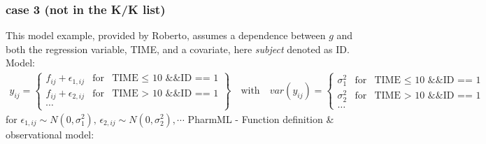 \documentclass[a4paper,10pt]{article}
\begin{document}
\subsubsection{case 3 (not in the K/K list)}
This model example, provided by Roberto, assumes a dependence between $g$ and both the regression variable, TIME, and a covariate, here \textit{subject} denoted as ID.
Model: 
\begin{eqnarray}
y_{ij} = \left\{ \begin{array}{rcl}  f_{ij} + \epsilon_{1,ij}  & \mbox{for} & \text{TIME $\le$ 10 \&\& ID == 1} \\
f_{ij} + \epsilon_{2,ij}  & \mbox{for} & \text{TIME $>$ 10 \&\& ID == 1} \nonumber \\
\cdots \nonumber
\end{array}\right\} \quad \text{with} \quad
\mathit{var}(y_{ij}) = \left\{ \begin{array}{rcl}  \sigma_{1}^2  & \mbox{for} & \text{TIME $\le$ 10 \&\& ID == 1} \\
\sigma_{2}^2  & \mbox{for} & \text{TIME $>$ 10 \&\& ID == 1}  \nonumber \\
\dots && \nonumber
\end{array}\right.
\end{eqnarray}
for $\epsilon_{1,ij} \sim N(0,\sigma_1^2),\, \epsilon_{2,ij} \sim N(0,\sigma_2^2), \cdots$
PharmML - Function definition \& observational model:
\end{document}
